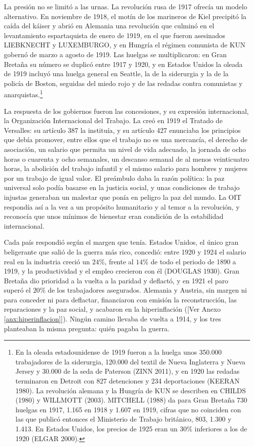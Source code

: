 \documentclass[10pt,a4paper]{article}
\newcommand{\authorfont}[1]{{\fontfamily{EBGaramond-TLF}\selectfont #1}}
\begin{document}
La presión no se limitó a las urnas. La revolución rusa de 1917 ofrecía un modelo alternativo. En noviembre de 1918, el motín de los marineros de Kiel precipitó la caída del káiser y abrió en Alemania una revolución que culminó en el levantamiento espartaquista de enero de 1919, en el que fueron asesinados LIEBKNECHT y LUXEMBURGO, y en Hungría el régimen comunista de KUN gobernó de marzo a agosto de 1919. Las huelgas se multiplicaron: en Gran Bretaña su número se duplicó entre 1917 y 1920, y en Estados Unidos la oleada de 1919 incluyó una huelga general en Seattle, la de la siderurgia y la de la policía de Boston, seguidas del miedo rojo y de las redadas contra comunistas y anarquistas.\footnote{%
    En la oleada estadounidense de 1919 fueron a la huelga unos 350.000 trabajadores de la siderurgia, 120.000 del textil de Nueva Inglaterra y Nueva Jersey y 30.000 de la seda de Paterson (ZINN 2011), y en 1920 las redadas terminaron en Detroit con 827 detenciones y 234 deportaciones (KEERAN 1980). La revolución alemana y la Hungría de KUN se describen en CHILDS (1980) y WILLMOTT (2003). MITCHELL (1988) da para Gran Bretaña 730 huelgas en 1917, 1.165 en 1918 y 1.607 en 1919, cifras que no coinciden con las que publicó entonces el Ministerio de Trabajo británico, 803, 1.300 y 1.413. En Estados Unidos, los precios de 1925 eran un $30\%$ inferiores a los de 1920 (ELGAR 2000).
}

La respuesta de los gobiernos fueron las concesiones, y su expresión internacional, la Organización Internacional del Trabajo. La creó en 1919 el Tratado de Versalles: su artículo 387 la instituía, y su artículo 427 enunciaba los principios que debía promover, entre ellos que el trabajo no es una mercancía, el derecho de asociación, un salario que permita un nivel de vida adecuado, la jornada de ocho horas o cuarenta y ocho semanales, un descanso semanal de al menos veinticuatro horas, la abolición del trabajo infantil y el mismo salario para hombres y mujeres por un trabajo de igual valor. El preámbulo daba la razón política: la paz universal solo podía basarse en la justicia social, y unas condiciones de trabajo injustas generaban un malestar que ponía en peligro la paz del mundo. La OIT respondía así a la vez a un propósito humanitario y al temor a la revolución, y reconocía que unos mínimos de bienestar eran condición de la estabilidad internacional.

Cada país respondió según el margen que tenía. Estados Unidos, el único gran beligerante que salió de la guerra más rico, concedió: entre 1920 y 1924 el salario real en la industria creció un $24\%$, frente al $14\%$ de todo el periodo de 1890 a 1919, y la productividad y el empleo crecieron con él (DOUGLAS 1930). Gran Bretaña dio prioridad a la vuelta a la paridad y deflactó, y en 1921 el paro superó el $20\%$ de los trabajadores asegurados. Alemania y Austria, sin margen ni para conceder ni para deflactar, financiaron con emisión la reconstrucción, las reparaciones y la paz social, y acabaron en la hiperinflación ([\authorfont{Ver Anexo \ref{anx:hiperinflacion}}]). Ningún camino llevaba de vuelta a 1914, y los tres planteaban la misma pregunta: quién pagaba la guerra.
\end{document}
